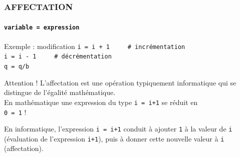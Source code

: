 \begin{frame}
\frametitle{\uppercase{Affectation}}
\framesubtitle{\tt variable \alert{=} expression}
\begin{block}{Exemple : modification}
\tt i \alert{=} i + 1 \ \ \ \ \# incrémentation\\%
\tt i \alert{=} i - 1 \ \ \ \ \# décrémentation\\%
\tt q \alert{=} q/b
\end{block}

\begin{block}{Attention !}
L'affectation est une opération typiquement informatique qui se distingue de
l'égalité mathématique.\\
En mathématique une expression du type \alert{\tt i = i+1}
se réduit en \\ \alert{\tt 0 = 1} !

En informatique, l'expression \alert{\tt i = i+1}
conduit à ajouter \alert{\tt 1} à la valeur de \alert{\tt i} (évaluation de 
l'expression \alert{\tt i+1}),
puis à donner cette nouvelle valeur à \alert{\tt i} (affectation).
\end{block}
\end{frame}
